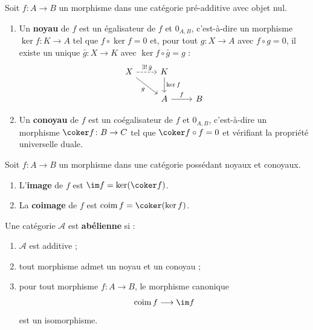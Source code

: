 \begin{definition}\label{def:kernel-cokernel}
Soit $f \colon A \to B$ un morphisme dans une catégorie pré-additive
avec objet nul.
\begin{enumerate}[label=(\roman*)]
\item Un \textbf{noyau} de $f$ est un
  égalisateur de $f$ et $0_{A,B}$, c'est-à-dire un
  morphisme $\ker f \colon K \to A$ tel que $f \circ \ker f = 0$ et,
  pour tout $g \colon X \to A$ avec $f \circ g = 0$, il existe un unique
  $\bar{g} \colon X \to K$ avec $\ker f \circ \bar{g} = g$ :
\[
\begin{tikzcd}
X \arrow[dr, "g"'] \arrow[r, dashed, "\exists!\,\bar{g}"]
& K \arrow[d, "\ker f"] \\
& A \arrow[r, "f"] & B
\end{tikzcd}
\]

\item Un \textbf{conoyau} de $f$ est un
  coégalisateur de $f$ et $0_{A,B}$, c'est-à-dire un
  morphisme $\coker f \colon B \to C$ tel que $\coker f \circ f = 0$ et
  vérifiant la propriété universelle duale.
\end{enumerate}
\end{definition}

\begin{definition}\label{def:image-coimage}
Soit $f \colon A \to B$ un morphisme dans une catégorie possédant
noyaux et conoyaux.
\begin{enumerate}[label=(\roman*)]
\item L'\textbf{image} de $f$ est $\im f = \ker(\coker f)$.
\item La \textbf{coimage} de $f$ est $\operatorname{coim} f = \coker(\ker f)$.
\end{enumerate}
\end{definition}

\begin{definition}\label{def:abelian-cat}
Une catégorie $\mathcal{A}$ est \textbf{abélienne} si :
\begin{enumerate}[label=(AB\arabic*)]
\item\label{AB0} $\mathcal{A}$ est additive ;
\item\label{AB1} tout morphisme admet un noyau et un conoyau ;
\item\label{AB2} pour tout morphisme $f \colon A \to B$, le morphisme
  canonique
  \[
    \operatorname{coim} f \longrightarrow \im f
  \]
  est un isomorphisme.
\end{enumerate}
\end{definition}

